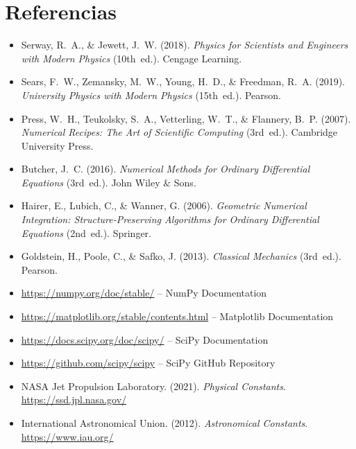 \documentclass{article}
\begin{document}
	\section{Referencias}
	\begin{itemize}			
		\item Serway, R.~A., \& Jewett, J.~W. (2018). \textit{Physics for Scientists and Engineers with Modern Physics} (10th~ed.). Cengage Learning.
		
		\item Sears, F.~W., Zemansky, M.~W., Young, H.~D., \& Freedman, R.~A. (2019). \textit{University Physics with Modern Physics} (15th~ed.). Pearson.
		
		\item Press, W.~H., Teukolsky, S.~A., Vetterling, W.~T., \& Flannery, B.~P. (2007). \textit{Numerical Recipes: The Art of Scientific Computing} (3rd~ed.). Cambridge University Press.
		
		\item Butcher, J.~C. (2016). \textit{Numerical Methods for Ordinary Differential Equations} (3rd~ed.). John Wiley \& Sons.
		
		\item Hairer, E., Lubich, C., \& Wanner, G. (2006). \textit{Geometric Numerical Integration: Structure-Preserving Algorithms for Ordinary Differential Equations} (2nd~ed.). Springer.
		
		\item Goldstein, H., Poole, C., \& Safko, J. (2013). \textit{Classical Mechanics} (3rd~ed.). Pearson.
		
		\item \url{https://numpy.org/doc/stable/} -- NumPy Documentation
		
		\item \url{https://matplotlib.org/stable/contents.html} -- Matplotlib Documentation
		
		\item \url{https://docs.scipy.org/doc/scipy/} -- SciPy Documentation
		
		\item \url{https://github.com/scipy/scipy} -- SciPy GitHub Repository
		
		\item NASA Jet Propulsion Laboratory. (2021). \textit{Physical Constants}. \url{https://ssd.jpl.nasa.gov/}
		
		\item International Astronomical Union. (2012). \textit{Astronomical Constants}. \url{https://www.iau.org/}
	\end{itemize}	
\end{document}
